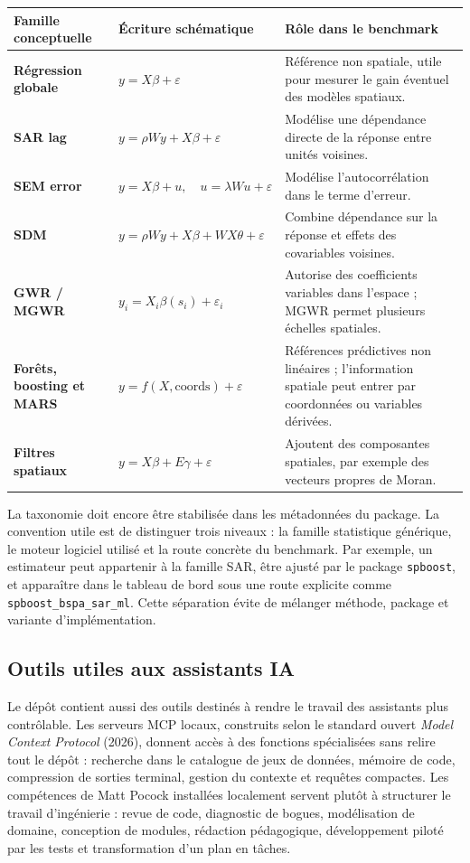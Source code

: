 \documentclass[11pt,a4paper]{article}
\begin{document}
\begin{center}
\scriptsize
\begin{tabularx}{\textwidth}{>{\bfseries}p{2.7cm}p{4.0cm}X}
\toprule
Famille conceptuelle & Écriture schématique & Rôle dans le benchmark \\
\midrule
Régression globale & $y = X\beta + \varepsilon$ & Référence non spatiale, utile pour mesurer le gain éventuel des modèles spatiaux. \\
SAR lag & $y = \rho Wy + X\beta + \varepsilon$ & Modélise une dépendance directe de la réponse entre unités voisines. \\
SEM error & $y = X\beta + u,\quad u=\lambda Wu+\varepsilon$ & Modélise l'autocorrélation dans le terme d'erreur. \\
SDM & $y = \rho Wy + X\beta + WX\theta + \varepsilon$ & Combine dépendance sur la réponse et effets des covariables voisines. \\
GWR / MGWR & $y_i = X_i\beta(s_i)+\varepsilon_i$ & Autorise des coefficients variables dans l'espace ; MGWR permet plusieurs échelles spatiales. \\
Forêts, boosting et MARS & $y = f(X,\mathrm{coords})+\varepsilon$ & Références prédictives non linéaires ; l'information spatiale peut entrer par coordonnées ou variables dérivées. \\
Filtres spatiaux & $y = X\beta + E\gamma + \varepsilon$ & Ajoutent des composantes spatiales, par exemple des vecteurs propres de Moran. \\
\bottomrule
\end{tabularx}
\end{center}

La taxonomie doit encore être stabilisée dans les métadonnées du package. La convention utile est de distinguer trois niveaux : la famille statistique générique, le moteur logiciel utilisé et la route concrète du benchmark. Par exemple, un estimateur peut appartenir à la famille SAR, être ajusté par le package \texttt{spboost}, et apparaître dans le tableau de bord sous une route explicite comme \texttt{spboost\_bspa\_sar\_ml}. Cette séparation évite de mélanger méthode, package et variante d'implémentation.

\subsection{Outils utiles aux assistants IA}

Le dépôt contient aussi des outils destinés à rendre le travail des assistants plus contrôlable. Les serveurs MCP locaux, construits selon le standard ouvert \textit{Model Context Protocol} (2026), donnent accès à des fonctions spécialisées sans relire tout le dépôt : recherche dans le catalogue de jeux de données, mémoire de code, compression de sorties terminal, gestion du contexte et requêtes compactes. Les compétences de Matt Pocock installées localement servent plutôt à structurer le travail d'ingénierie : revue de code, diagnostic de bogues, modélisation de domaine, conception de modules, rédaction pédagogique, développement piloté par les tests et transformation d'un plan en tâches.
\end{document}
